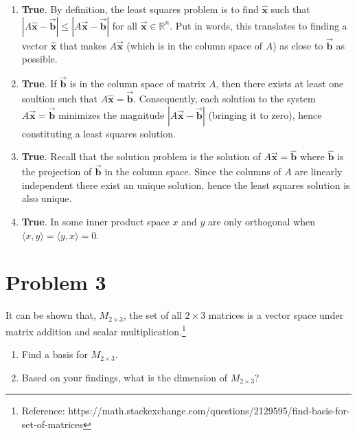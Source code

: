 \documentclass[letter,11pt]{article}
\theoremstyle{definition}
\begin{document}
\begin{tcolorbox}[boxrule=1mm,enhanced jigsaw, breakable,before=\hfill,after=\hfill,adjusted title={Problem 2 solutions}]
    \begin{enumerate}[label = \roman*.]
        \item \textbf{True}. By definition, the least squares problem is to find $\hat{\boldsymbol{x}}$ such that $|A\hat{\boldsymbol{x}} - \vec{\boldsymbol{b}}| \leq |A\vec{\boldsymbol{x}} - \vec{\boldsymbol{b}}|$ for all $\vec{\boldsymbol{x}}\in\mathbb{R}^n$. Put in words, this translates to finding a vector $\hat{\boldsymbol{x}}$ that makes $A\vec{\boldsymbol{x}}$ (which is in the column space of $A$) as close to $\vec{\boldsymbol{b}}$ as possible.
        
        \item \textbf{True}. If $\vec{\boldsymbol{b}}$ is in the column space of matrix $A$, then there exists at least one soultion such that $A\hat{\boldsymbol{x}} = \vec{\boldsymbol{b}}$. Consequently, each solution to the system $A\vec{\boldsymbol{x}} = \vec{\boldsymbol{b}}$ minimizes the magnitude $|A\vec{\boldsymbol{x}} - \vec{\boldsymbol{b}}|$ (bringing it to zero), hence constituting a least squares solution.
        
        \item \textbf{True}. Recall that the solution problem is the solution of $A\vec{\boldsymbol{x}} = \hat{\boldsymbol{b}}$ where $\hat{\boldsymbol{b}}$ is the projection of $\vec{\boldsymbol{b}}$ in the column space. Since the columns of $A$ are linearly independent there exist an unique solution, hence the least squares solution is also unique. 
        
        \item \textbf{True}. In some inner product space $x$ and $y$ are only orthogonal when $\langle x, y\rangle = \langle y, x\rangle = 0$. 
    \end{enumerate}
\end{tcolorbox}

\section{Problem 3}
It can be shown that, $M_{2 \times 3}$, the set of all $2 \times 3$ matrices is a vector space under matrix addition and scalar multiplication.\footnote{Reference: https://math.stackexchange.com/questions/2129595/find-basis-for-set-of-matrices}

\begin{enumerate}[label = \roman*.]
    \item Find a basis for $M_{2 \times 3}$.
    \item Based on your findings, what is the dimension of $M_{2 \times 3}$?
\end{enumerate}
\end{document}

